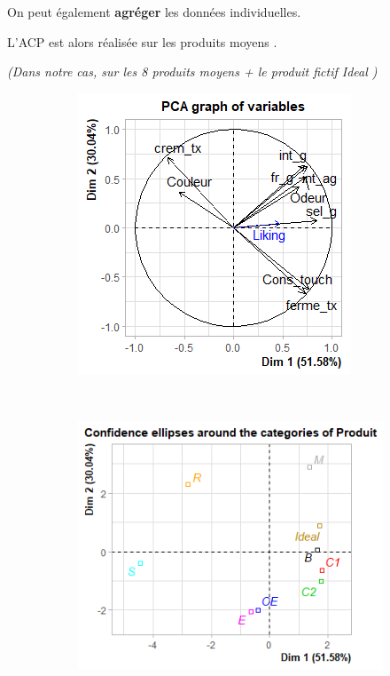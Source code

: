 \documentclass[aspectratio=169,xcolor=dvipsnames]{beamer}
\begin{document}
\begin{frame}
\textcolor{nyubluedarker}{\faCogs} On peut également \textbf{agréger} les données individuelles.

\medskip


\textcolor{nyubluedarker}{\faCogs} L'ACP est alors réalisée sur les \og produits moyens \fg{}.

\medskip

\textcolor{nyubluedarker}{\faCogs} \emph{(Dans notre cas, sur les 8 \og produits moyens \fg{} + le produit fictif \og Ideal \fg{})}

\medskip

\begin{figure}
\centering
\begin{subfigure}{0.5\textwidth}
\begin{center}
\includegraphics[scale=0.5]{pca_agg_var.png}
\end{center}
\end{subfigure}~
\begin{subfigure}{0.5\textwidth}
\begin{center}
\includegraphics[scale=0.5]{pca_agg_ind.png}
\end{center}
\end{subfigure}
\end{figure}

\end{frame}
\end{document}
